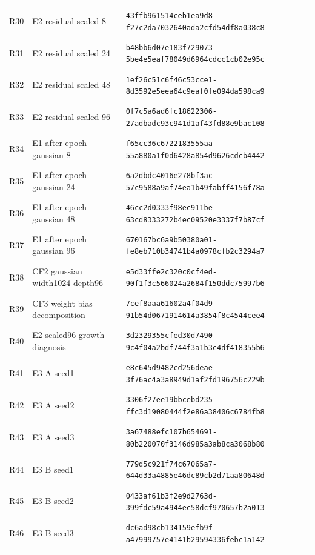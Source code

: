 \begin{longtable}{@{}l>{\raggedright\arraybackslash}p{3.5cm}p{10.8cm}@{}}
\hypertarget{R30}{R30} & E2 residual scaled 8 & {\fontsize{8.8}{11}\selectfont\texttt{43ffb961514ceb1ea9d8-f27c2da7032640ada2cfd54df8a038c8}} \\
\hypertarget{R31}{R31} & E2 residual scaled 24 & {\fontsize{8.8}{11}\selectfont\texttt{b48bb6d07e183f729073-5be4e5eaf78049d6964cdcc1cb02e95c}} \\
\hypertarget{R32}{R32} & E2 residual scaled 48 & {\fontsize{8.8}{11}\selectfont\texttt{1ef26c51c6f46c53cce1-8d3592e5eea64c9eaf0fe094da598ca9}} \\
\hypertarget{R33}{R33} & E2 residual scaled 96 & {\fontsize{8.8}{11}\selectfont\texttt{0f7c5a6ad6fc18622306-27adbadc93c941d1af43fd88e9bac108}} \\
\hypertarget{R34}{R34} & E1 after epoch gaussian 8 & {\fontsize{8.8}{11}\selectfont\texttt{f65cc36c6722183555aa-55a880a1f0d6428a854d9626cdcb4442}} \\
\hypertarget{R35}{R35} & E1 after epoch gaussian 24 & {\fontsize{8.8}{11}\selectfont\texttt{6a2dbdc4016e278bf3ac-57c9588a9af74ea1b49fabff4156f78a}} \\
\hypertarget{R36}{R36} & E1 after epoch gaussian 48 & {\fontsize{8.8}{11}\selectfont\texttt{46cc2d0333f98ec911be-63cd8333272b4ec09520e3337f7b87cf}} \\
\hypertarget{R37}{R37} & E1 after epoch gaussian 96 & {\fontsize{8.8}{11}\selectfont\texttt{670167bc6a9b50380a01-fe8eb710b34741b4a0978cfb2c3294a7}} \\
\hypertarget{R38}{R38} & CF2 gaussian width1024 depth96 & {\fontsize{8.8}{11}\selectfont\texttt{e5d33ffe2c320c0cf4ed-90f1f3c566024a2684f150ddc75997b6}} \\
\hypertarget{R39}{R39} & CF3 weight bias decomposition & {\fontsize{8.8}{11}\selectfont\texttt{7cef8aaa61602a4f04d9-91b54d0671914614a3854f8c4544cee4}} \\
\hypertarget{R40}{R40} & E2 scaled96 growth diagnosis & {\fontsize{8.8}{11}\selectfont\texttt{3d2329355cfed30d7490-9c4f04a2bdf744f3a1b3c4df418355b6}} \\
\hypertarget{R41}{R41} & E3 A seed1 & {\fontsize{8.8}{11}\selectfont\texttt{e8c645d9482cd256deae-3f76ac4a3a8949d1af2fd196756c229b}} \\
\hypertarget{R42}{R42} & E3 A seed2 & {\fontsize{8.8}{11}\selectfont\texttt{3306f27ee19bbcebd235-ffc3d19080444f2e86a38406c6784fb8}} \\
\hypertarget{R43}{R43} & E3 A seed3 & {\fontsize{8.8}{11}\selectfont\texttt{3a67488efc107b654691-80b220070f3146d985a3ab8ca3068b80}} \\
\hypertarget{R44}{R44} & E3 B seed1 & {\fontsize{8.8}{11}\selectfont\texttt{779d5c921f74c67065a7-644d33a4885e46dc89cb2d71aa80648d}} \\
\hypertarget{R45}{R45} & E3 B seed2 & {\fontsize{8.8}{11}\selectfont\texttt{0433af61b3f2e9d2763d-399fdc59a4944ec58dcf970657b2a013}} \\
\hypertarget{R46}{R46} & E3 B seed3 & {\fontsize{8.8}{11}\selectfont\texttt{dc6ad98cb134159efb9f-a47999757e4141b29594336febc1a142}} \\
\bottomrule\end{longtable}\endgroup
